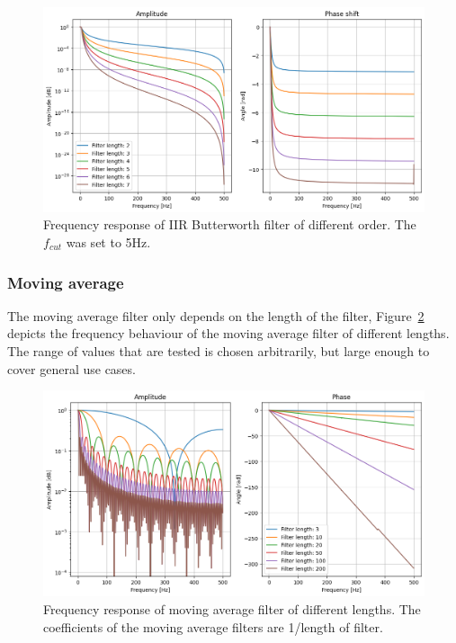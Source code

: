 \begin{figure}[h!t]
	\begin{center}
		\includegraphics[width=1.0\columnwidth]{images/iir_frequencyresponse_coefficients.png}
	\end{center}
	\caption{Frequency response of IIR Butterworth filter of different order. The $f_{cut}$ was set to 5Hz.}
	\label{fig:iir_frequencyresponse_coefficients}
\end{figure}

\subsubsection{Moving average}
The moving average filter only depends on the length of the filter, Figure~\ref{fig:movingaverage_frequencyresponse_coefficients} depicts the frequency behaviour of the moving average filter of different lengths. The range of values that are tested is chosen arbitrarily, but large enough to cover general use cases.

\begin{figure}[h!t]
	\begin{center}
		\includegraphics[width=1.0\columnwidth]{images/movingaverage_frequencyresponse_coefficients.png}
	\end{center}
	\caption{Frequency response of moving average filter of different lengths. The coefficients of the moving average filters are 1/length of filter.}
	\label{fig:movingaverage_frequencyresponse_coefficients}
\end{figure}

